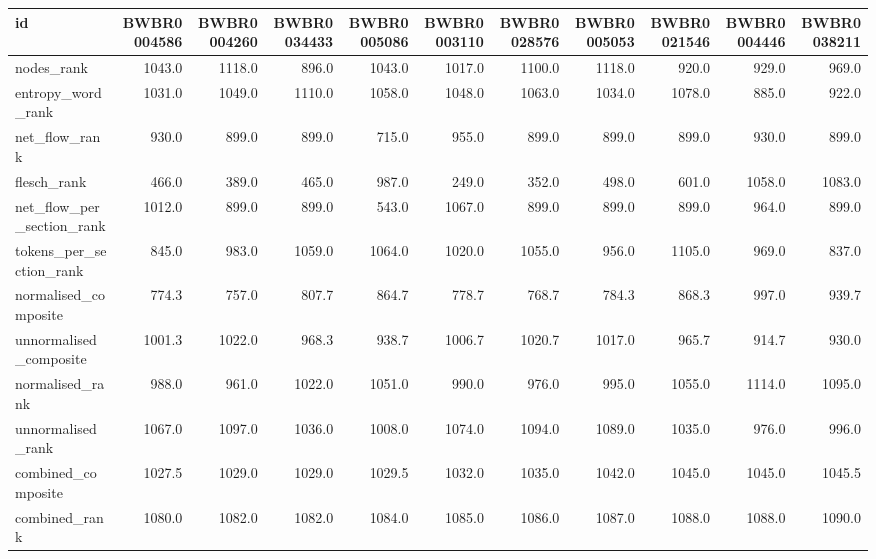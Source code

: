 \begin{tabular}{lrrrrrrrrrr}
\toprule
id & BWBR0004586 & BWBR0004260 & BWBR0034433 & BWBR0005086 & BWBR0003110 & BWBR0028576 & BWBR0005053 & BWBR0021546 & BWBR0004446 & BWBR0038211 \\
\midrule
nodes\_rank & 1043.0 & 1118.0 & 896.0 & 1043.0 & 1017.0 & 1100.0 & 1118.0 & 920.0 & 929.0 & 969.0 \\
\cline{1-11}
entropy\_word\_rank & 1031.0 & 1049.0 & 1110.0 & 1058.0 & 1048.0 & 1063.0 & 1034.0 & 1078.0 & 885.0 & 922.0 \\
\cline{1-11}
net\_flow\_rank & 930.0 & 899.0 & 899.0 & 715.0 & 955.0 & 899.0 & 899.0 & 899.0 & 930.0 & 899.0 \\
\cline{1-11}
flesch\_rank & 466.0 & 389.0 & 465.0 & 987.0 & 249.0 & 352.0 & 498.0 & 601.0 & 1058.0 & 1083.0 \\
\cline{1-11}
net\_flow\_per\_section\_rank & 1012.0 & 899.0 & 899.0 & 543.0 & 1067.0 & 899.0 & 899.0 & 899.0 & 964.0 & 899.0 \\
\cline{1-11}
tokens\_per\_section\_rank & 845.0 & 983.0 & 1059.0 & 1064.0 & 1020.0 & 1055.0 & 956.0 & 1105.0 & 969.0 & 837.0 \\
\cline{1-11}
normalised\_composite & 774.3 & 757.0 & 807.7 & 864.7 & 778.7 & 768.7 & 784.3 & 868.3 & 997.0 & 939.7 \\
\cline{1-11}
unnormalised\_composite & 1001.3 & 1022.0 & 968.3 & 938.7 & 1006.7 & 1020.7 & 1017.0 & 965.7 & 914.7 & 930.0 \\
\cline{1-11}
normalised\_rank & 988.0 & 961.0 & 1022.0 & 1051.0 & 990.0 & 976.0 & 995.0 & 1055.0 & 1114.0 & 1095.0 \\
\cline{1-11}
unnormalised\_rank & 1067.0 & 1097.0 & 1036.0 & 1008.0 & 1074.0 & 1094.0 & 1089.0 & 1035.0 & 976.0 & 996.0 \\
\cline{1-11}
combined\_composite & 1027.5 & 1029.0 & 1029.0 & 1029.5 & 1032.0 & 1035.0 & 1042.0 & 1045.0 & 1045.0 & 1045.5 \\
\cline{1-11}
combined\_rank & 1080.0 & 1082.0 & 1082.0 & 1084.0 & 1085.0 & 1086.0 & 1087.0 & 1088.0 & 1088.0 & 1090.0 \\
\cline{1-11}
\bottomrule
\end{tabular}
